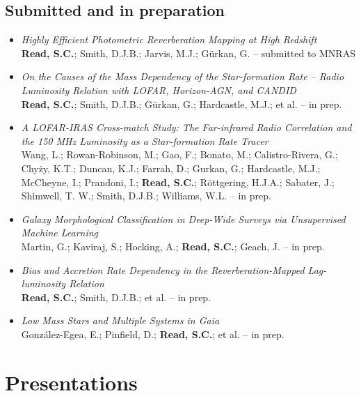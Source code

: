 \documentclass[letterpaper]{twentysecondcv} %
\begin{document}
\subsection{Submitted and in preparation}
\begin{itemize}
     \item \textit{Highly Efficient Photometric Reverberation Mapping at High Redshift}\\{\small \textbf{Read, S.C.}; Smith, D.J.B.; Jarvis, M.J.; Gürkan, G. -- submitted to MNRAS}
 \item \textit{On the Causes of the Mass Dependency of the Star-formation Rate -- Radio
Luminosity Relation with LOFAR, Horizon-AGN, and CANDID}\\{\small \textbf{Read, S.C.}; Smith, D.J.B.; Gürkan, G.; Hardcastle, M.J.; et al. -- in prep.}
 \item \textit{A LOFAR-IRAS Cross-match Study: The Far-infrared Radio Correlation and
the 150 MHz Luminosity as a Star-formation Rate Tracer}\\{\small Wang, L.; Rowan-Robinson, M.; Gao, F.; Bonato, M.; Calistro-Rivera, G.;
Chyży, K.T.; Duncan, K.J.; Farrah, D.; Gurkan, G.; Hardcastle, M.J.;
McCheyne, I.; Prandoni, I.; \textbf{Read, S.C.}; Röttgering, H.J.A.;
Sabater, J.; Shimwell, T. W.; Smith, D.J.B.; Williams, W.L. -- in prep.}
 \item \textit{Galaxy Morphological Classification in Deep-Wide Surveys via
Unsupervised Machine Learning}\\{\small Martin, G.; Kaviraj, S.; Hocking, A.; \textbf{Read, S.C.}; Geach, J. -- in prep.}
 \item \textit{Bias and Accretion Rate Dependency in the Reverberation-Mapped
Lag-luminosity Relation}\\{\small \textbf{Read, S.C.}; Smith, D.J.B.; et al. -- in prep.}
 \item \textit{Low Mass Stars and Multiple Systems in Gaia}\\{\small González-Egea, E.; Pinfield, D.; \textbf{Read, S.C.}; et al. -- in prep.}
\end{itemize}

\section{Presentations}
\begin{twenty}
\end{twenty}
\end{document}
